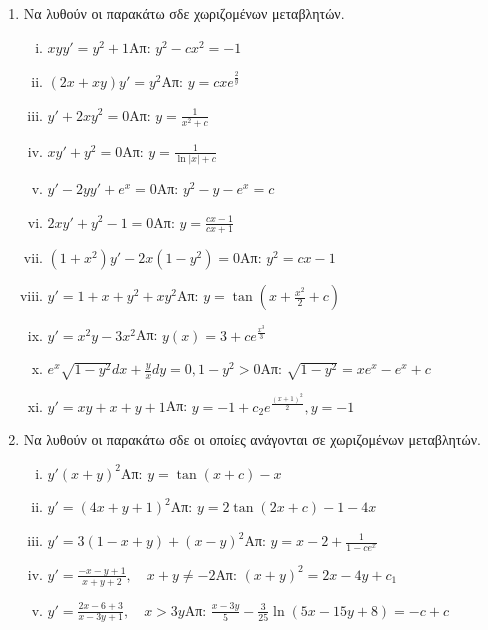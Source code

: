 \documentclass[a4paper,12pt]{article}
\begin{document}
\begin{center}
\end{center}

\vspace{\baselineskip}

\begin{enumerate}

\item Να λυθούν οι παρακάτω σδε χωριζομένων μεταβλητών.

\begin{enumerate}[i)]

\item $xyy'=y^2+1$\hfill Απ: $y^2-cx^2=-1$
\item $(2x+xy)y'=y^2$\hfill Απ: $y=cxe^{\frac{2}{y}}$
\item $y'+2xy^2=0$\hfill Απ: $y=\frac{1}{x^2+c}$
\item $xy'+y^2=0$\hfill Απ: $y=\frac{1}{\ln|x|+c}$
\item $y'-2yy'+e^x=0$\hfill Απ: $y^2-y-e^x=c$
\item $2xy'+y^2-1=0$\hfill Απ: $y=\frac{cx-1}{cx+1}$
\item $(1+x^2)y'-2x(1-y^2)=0$\hfill Απ: $y^2=cx-1$
\item $y'=1+x+y^2+xy^2$\hfill Απ: $y=\tan(x+\frac{x^2}{2}+c)$
\item $y'=x^2y-3x^2$\hfill Απ: $y(x)=3+ce^{\frac{x^3}{3}}$
\item $e^x\sqrt{1-y^2}dx+\frac{y}{x}dy=0, 1-y^2>0$\hfill Απ: $\sqrt{1-y^2}=xe^x-e^x+c$
\item $y'=xy+x+y+1$\hfill Απ: $y=-1+c_2e^{\frac{(x+1)^2}{2}}, y=-1$
\end{enumerate}

\item Να λυθούν οι παρακάτω σδε οι οποίες ανάγονται σε χωριζομένων μεταβλητών.

\begin{enumerate}[i)]

\item $y'(x+y)^2$\hfill Απ: $y=\tan (x+c)-x$
\item $y'=(4x+y+1)^2$\hfill Απ: $y=2\tan(2x+c)-1-4x$
\item $y'=3(1-x+y)+(x-y)^2$\hfill Απ: $y=x-2+\frac{1}{1-ce^x}$
\item $y'=\frac{-x-y+1}{x+y+2}, \quad x+y\neq -2$\hfill Απ: $(x+y)^2=2x-4y+c_1$
\item $y'=\frac{2x-6+3}{x-3y+1}, \quad x>3y$\hfill Απ: $\frac{x-3y}{5}-\frac{3}{25}\ln(5x-15y+8)=-c+c$


\end{enumerate}
\end{enumerate}
\end{document}
